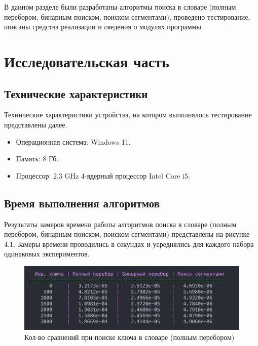 \documentclass[a4paper,14pt, unknownkeysallowed]{extreport}
\begin{document}
В данном разделе были разработаны алгоритмы поиска в словаре (полным перебором, бинарным поиском, поиском сегментами), проведено тестирование, описаны средства реализации и cведения о модулях программы.





\chapter{Исследовательская часть}

\section{Технические характеристики}

Технические характеристики устройства, на котором выполнялось тестирование представлены далее.

\begin{itemize}
    \item Операционная система: Windows 11.
    \item Память: 8 Гб.
    \item Процессор: 2,3 GHz 4-ядерный процессор Intel Core i5.
\end{itemize}

\section{Время выполнения алгоритмов}

Результаты замеров времени работы алгоритмов поиска в словаре (полным перебором, бинарным поиском, поиском сегментами) представлены на рисунке 4.1. Замеры времени проводились в секундах и усреднялись для каждого набора одинаковых экспериментов.


\begin{figure}[h]
	\centering
	\includegraphics[scale=0.45]{report_files/time.png}
	\caption{Кол-во сравнений при поиске ключа в словаре (полным перебором)}
	\label{fig:graph_full_search}
\end{figure}
\end{document}
